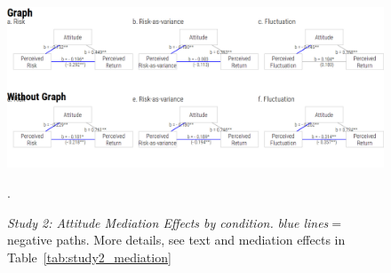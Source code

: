 \documentclass[a4paper,man, natbib,floatsintext]{apa6} %
\begin{document}
\begin{figure}[H]
    \centering
    \includegraphics{fig7}
    \caption{\textit{Study 2: Attitude Mediation Effects by condition.} \textit{blue lines}$=$negative paths. More details, see text and mediation effects in Table~\ref{tab:study2_mediation}}.
    \label{fig:study2_mediation_paths}
\end{figure}
\end{document}
